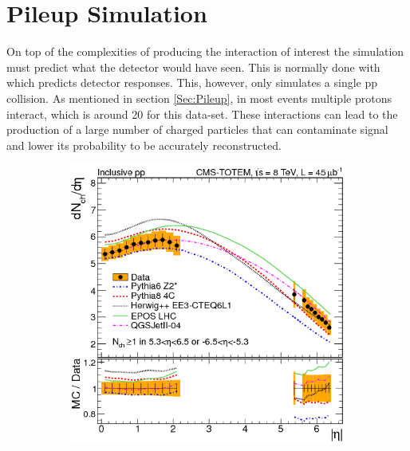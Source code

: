 \section{Pileup Simulation}
\label{Sec:SimRecon}
On top of the complexities of producing the interaction of interest the simulation must predict what the detector would have seen. This is normally done with \GEANTfour \cite{agostinelli2003} which predicts detector responses. This, however, only simulates a single pp collision. As mentioned in section \ref{Sec:Pileup}, in most events multiple protons interact, which is around 20 for this data-set. These interactions can lead to the production of a large number of charged particles that can contaminate signal and lower its probability to be accurately reconstructed. 
\begin{figure}
    \centering
    \begin{subfigure}[b]{\SideBySidePlotWidth} 
        \includegraphics[width=\linewidth]{figures/Simulation/EtaPileupDist.png}
        \caption{}
    \end{subfigure}%
    \begin{subfigure}[b]{1.\SideBySidePlotWidth}

\end{subfigure}
\end{figure}
